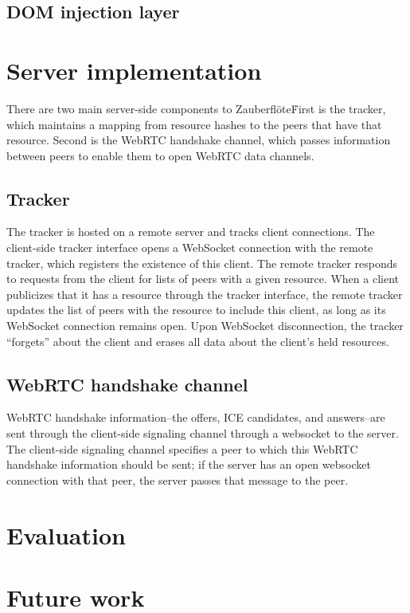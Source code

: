 \documentclass[letterpaper,twocolumn,10pt]{article}
\newcommand{\zbf}{Zauberfl\"{o}te}
\begin{document}
\subsection{DOM injection layer}

\section{Server implementation}

There are two main server-side components to \zbf\. First is the tracker,
which maintains a mapping from resource hashes to the peers that have that
resource. Second is the WebRTC handshake channel, which passes information
between peers to enable them to open WebRTC data channels.

\subsection{Tracker}
The tracker is hosted on a remote server and tracks client connections.
The client-side tracker interface  opens a WebSocket connection with the remote tracker,
which registers the existence of this client. The remote tracker responds to
requests from the client for lists of peers with a given resource. When a client
publicizes that it has a resource through the tracker interface, the remote tracker updates
the list of peers with the resource to include this client, as
long as its WebSocket connection remains open. Upon WebSocket disconnection,
the tracker ``forgets'' about the client and erases all data about the client's
held resources.

\subsection{WebRTC handshake channel}

WebRTC handshake information--the offers, ICE candidates, and answers--are
sent through the client-side signaling channel through a websocket to
the server. The client-side signaling channel specifies a peer to which
this WebRTC handshake information should be sent; if the server has an open
websocket connection with that peer, the server passes that message to the peer.

\section{Evaluation}


\section{Future work}
\end{document}
